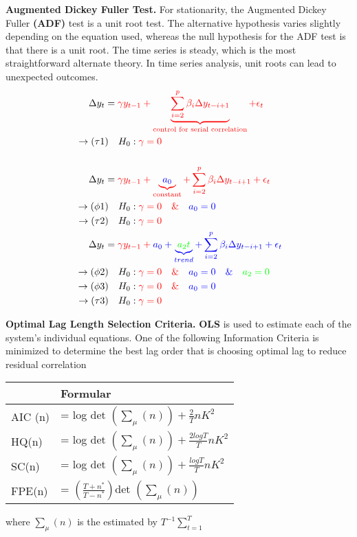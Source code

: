 \textbf{Augmented Dickey Fuller Test.} For stationarity, the Augmented Dickey Fuller \textbf{(ADF)} test is a unit root test. The alternative hypothesis varies slightly depending on the equation used, whereas the null hypothesis for the ADF test is that there is a unit root. The time series is steady, which is the most straightforward alternate theory. In time series analysis, unit roots can lead to unexpected outcomes.
\begin{align}        \Delta y_t &=  \color{red}\gamma y_{t-1} + \underbrace{\sum_{i=2}^{p} \beta_i \Delta y_{t-i+1}}_\text{control for serial correlation} + \epsilon_t  \\ \rightarrow (\tau1&)\quad H_0 : \color{red} {\gamma = 0} \\\\       \Delta y_t &=  \color{red}{\gamma} y_{t-1}  + \underbrace{\color{blue}{a_0}}_\text{constant} + \sum_{i=2}^{p} \beta_i \Delta y_{t-i+1} + \epsilon_t   \\ \rightarrow (\phi1&)\quad H_0 : \color{red} {\gamma = 0} \quad\&\quad\color{blue}{a_0 = 0}  \\\ \rightarrow (\tau2&)\quad H_0 : \color{red} {\gamma = 0}  \\\       \Delta y_t &=  \color{red}{\gamma} y_{t-1}  + \color{blue}{a_0}  + \underbrace{\color{green}{a_2} t}_{trend} + \sum_{i=2}^{p} \beta_i \Delta y_{t-i+1}  + \epsilon_t \\ \rightarrow (\phi2&)\quad H_0 : \color{red} {\gamma = 0} \quad\&\quad \color{blue}{a_0 = 0} \quad\&\quad \color{green}{a_2 = 0} \\ \rightarrow (\phi3&)\quad H_0 : \color{red} {\gamma = 0} \quad\&\quad\color{blue}{a_0 = 0}  \\ \rightarrow (\tau3&)\quad H_0 : \color{red} {\gamma = 0}    
 \end{align}

\textbf{Optimal Lag Length Selection Criteria.} \textbf{OLS} is used to estimate each of the system's individual equations. One of the following Information Criteria is minimized to determine the best lag order that is choosing optimal lag  to reduce residual correlation
\begin{center}
		\begin{tabular}{ll}
			\multicolumn{1}{c}{}Criteria &  Formular \\ \midrule
			AIC (n)  & = log det $ \displaystyle\left(\sum _{\mu}(n)\right)+ \frac{2}{T}nK^{2}$\\
			HQ(n)    & = log det  $ \displaystyle\left(\sum _{\mu}(n)\right)+ \frac{2logT}{T}nK^{2}$\\
			SC(n)    & = log det  $ \displaystyle\left(\sum _{\mu}(n)\right)+ \frac{logT}{T}nK^{2}$\\
			FPE(n)   & =          $\displaystyle \left(\frac{T + n^{*}}{T - n^{*}}\right)$det $\displaystyle \left(\sum_{\mu}(n)\right)$\\ \bottomrule
		\end{tabular}
\end{center}
where $ \displaystyle \sum_{\mu} (n)$ is the estimated by $T^{-1}\sum_{t=1}^{T}$
